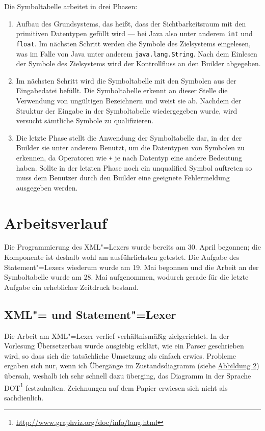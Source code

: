 \documentclass[10pt,a4paper,ngerman,titlepage,tocindentauto]{scrartcl}
\newcommand{\link}[1]{\href{#1}{#1}}
\newcommand{\fnlink}[1]{\footnote{\link{#1}}}
\begin{document}
			Die Symboltabelle arbeitet in drei Phasen:
			\begin{enumerate}
				\item
					Aufbau des Grundsystems, das heißt, dass der Sichtbarkeitsraum mit den primitiven
					Datentypen gefüllt wird --- bei Java also unter anderem \texttt{int} und \texttt{float}.
					Im nächsten Schritt werden die Symbole des Zielsystems eingelesen, was im Falle von
					Java unter anderem \texttt{java.lang.String}. Nach dem Einlesen der Symbole des
					Zielsystems wird der Kontrollfluss an den Builder abgegeben.
				\item
					Im nächsten Schritt wird die Symboltabelle mit den Symbolen aus der Eingabedatei befüllt.
					Die Symboltabelle erkennt an dieser Stelle die Verwendung von ungültigen Bezeichnern und weist
					sie ab. Nachdem der Struktur der Eingabe in der Symboltabelle wiedergegeben wurde, wird versucht
					sämtliche Symbole zu qualifizieren.
				\item
					Die letzte Phase stellt die Anwendung der Symboltabelle dar, in der der Builder sie unter anderem
					Benutzt, um die Datentypen von Symbolen zu erkennen, da Operatoren wie \texttt + je nach Datentyp
					eine andere Bedeutung haben. Sollte in der letzten Phase noch ein unqualified Symbol auftreten
					so muss dem Benutzer durch den Builder eine geeignete Fehlermeldung ausgegeben werden.
			\end{enumerate}
	
	\section[Arbeitsverlauf]{\hypertarget{Arbeitsverlauf}{Arbeitsverlauf}}
		Die Programmierung des XML"=Lexers wurde bereits am 30. April begonnen; die Komponente ist deshalb
		wohl am ausführlichsten getestet. Die Aufgabe des Statement"=Lexers wiederum wurde
		am 19. Mai begonnen und die Arbeit an der Symboltabelle wurde am 28. Mai aufgenommen,
		wodurch gerade für die letzte Aufgabe ein erheblicher Zeitdruck bestand.
		
		\subsection{XML"= und Statement"=Lexer}
			Die Arbeit am XML"=Lexer verlief verhältnismäßig zielgerichtet. In der Vorlesung
			Übersetzerbau wurde ausgiebig erklärt, wie ein Parser geschrieben wird, so dass
			sich die tatsächliche Umsetzung als einfach erwies. Probleme ergaben sich nur,
			wenn ich Übergänge im Zustandsdiagramm (siehe \hyperlink{Uebergangsdiagramm_XML_Lexer}{Abbildung 2})
			übersah, weshalb ich sehr schnell dazu überging, das Diagramm in der Sprache
			DOT\fnlink{http://www.graphviz.org/doc/info/lang.html} festzuhalten. Zeichnungen auf
			dem Papier erwiesen sich nicht als sachdienlich.
		
\end{document}
